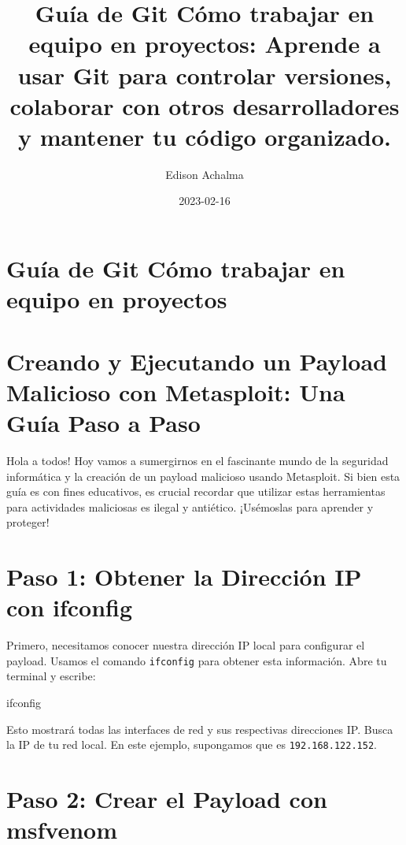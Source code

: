 \documentclass[
  jou,
  floatsintext,
  longtable,
  a4paper,
  nolmodern,
  notxfonts,
  notimes,
  colorlinks=true,linkcolor=blue,citecolor=blue,urlcolor=blue]{apa7}
\title{Guía de Git Cómo trabajar en equipo en proyectos: Aprende a usar
Git para controlar versiones, colaborar con otros desarrolladores y
mantener tu código organizado.}
\author{Edison Achalma}
\affiliation{
{Escuela Profesional de Economía, Universidad Nacional de San Cristóbal
de Huamanga}}
\date{2023-02-16}
\newenvironment{Shaded}{\begin{snugshade}}{\end{snugshade}}
\newcommand{\ExtensionTok}[1]{\textcolor[rgb]{0.00,0.23,0.31}{#1}}
\begin{document}
\maketitle

\hypertarget{toc}{}
\tableofcontents
\newpage
\section[Introduction]{Guía de Git Cómo trabajar en equipo en proyectos}

\setcounter{secnumdepth}{-\maxdimen} %

\setlength\LTleft{0pt}


\section{Creando y Ejecutando un Payload Malicioso con Metasploit: Una
Guía Paso a
Paso}\label{creando-y-ejecutando-un-payload-malicioso-con-metasploit-una-guuxeda-paso-a-paso}

Hola a todos! Hoy vamos a sumergirnos en el fascinante mundo de la
seguridad informática y la creación de un payload malicioso usando
Metasploit. Si bien esta guía es con fines educativos, es crucial
recordar que utilizar estas herramientas para actividades maliciosas es
ilegal y antiético. ¡Usémoslas para aprender y proteger!

\section{Paso 1: Obtener la Dirección IP con
ifconfig}\label{paso-1-obtener-la-direcciuxf3n-ip-con-ifconfig}

Primero, necesitamos conocer nuestra dirección IP local para configurar
el payload. Usamos el comando \texttt{ifconfig} para obtener esta
información. Abre tu terminal y escribe:

\begin{Shaded}
\begin{Highlighting}[]
\ExtensionTok{ifconfig}
\end{Highlighting}
\end{Shaded}

Esto mostrará todas las interfaces de red y sus respectivas direcciones
IP. Busca la IP de tu red local. En este ejemplo, supongamos que es
\texttt{192.168.122.152}.

\section{Paso 2: Crear el Payload con
msfvenom}\label{paso-2-crear-el-payload-con-msfvenom}
\end{document}
